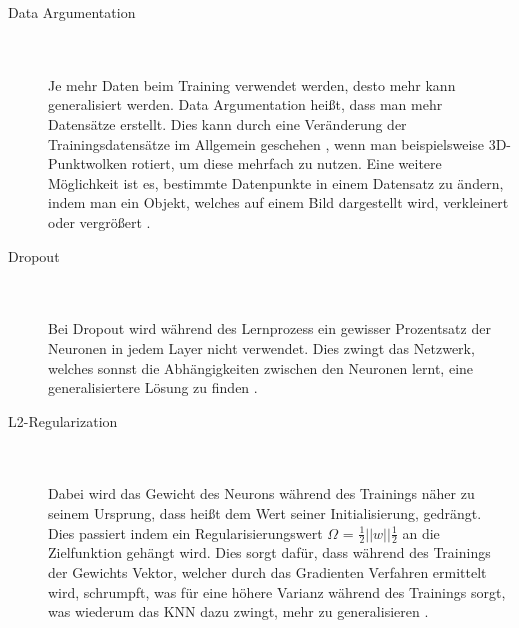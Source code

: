 \documentclass{llncs}
\begin{document}
\begin{description}
\item[Data Argumentation]
~\\\\
Je mehr Daten beim Training verwendet werden, desto mehr kann generalisiert werden. Data Argumentation heißt, dass man mehr Datensätze erstellt. Dies kann durch eine Veränderung der Trainingsdatensätze im Allgemein geschehen \cite{Grundlagen}, wenn man beispielsweise 3D-Punktwolken rotiert, um diese mehrfach zu nutzen. Eine weitere Möglichkeit ist es, bestimmte Datenpunkte in einem Datensatz zu ändern, indem man ein Objekt, welches auf einem Bild dargestellt wird, verkleinert oder vergrößert \cite{Grundlagen}. \\
\item[Dropout]
~\\\\
Bei Dropout wird während des Lernprozess ein gewisser Prozentsatz der Neuronen in jedem Layer nicht verwendet. Dies zwingt das Netzwerk, welches sonnst die Abhängigkeiten zwischen den Neuronen lernt, eine generalisiertere Lösung zu finden \cite{dropout}.\\
\item[L2-Regularization]
~\\\\
Dabei wird das Gewicht des Neurons während des Trainings näher zu seinem Ursprung, dass heißt dem Wert seiner Initialisierung, gedrängt. Dies passiert indem ein Regularisierungswert $\Omega$ = $\frac{1}{2}||w||\frac{1}{2}$ an die Zielfunktion gehängt wird. Dies sorgt dafür, dass während des Trainings der Gewichts Vektor, welcher durch das Gradienten Verfahren ermittelt wird, schrumpft, was für eine höhere Varianz während des Trainings sorgt, was wiederum das KNN dazu zwingt, mehr zu generalisieren \cite{Grundlagen}.\\ 
\end{description}
\end{document}
